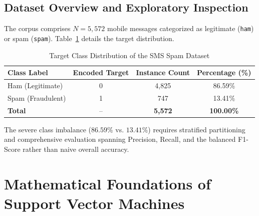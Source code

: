 \documentclass[12pt]{article}
\begin{document}
\subsection{Dataset Overview and Exploratory Inspection}
The corpus comprises $N = 5,572$ mobile messages categorized as legitimate (\texttt{ham}) or spam (\texttt{spam}). Table~\ref{tab:dataset_dist} details the target distribution.

\begin{table}[H]
\centering
\caption{Target Class Distribution of the SMS Spam Dataset}
\label{tab:dataset_dist}
\vspace{0.2cm}
\begin{tabular}{lccc}
\toprule
\textbf{Class Label} & \textbf{Encoded Target} & \textbf{Instance Count} & \textbf{Percentage (\%)} \\
\midrule
Ham (Legitimate) & 0 & 4,825 & 86.59\% \\
Spam (Fraudulent) & 1 & 747 & 13.41\% \\
\midrule
\textbf{Total} & -- & \textbf{5,572} & \textbf{100.00\%} \\
\bottomrule
\end{tabular}
\end{table}

The severe class imbalance ($86.59\%$ vs. $13.41\%$) requires stratified partitioning and comprehensive evaluation spanning Precision, Recall, and the balanced F1-Score rather than naive overall accuracy.

\newpage
\section{Mathematical Foundations of Support Vector Machines}
\end{document}
